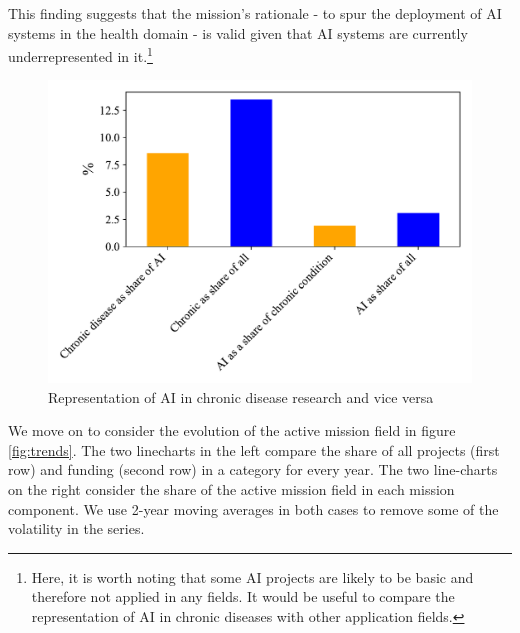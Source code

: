 \documentclass[11pt]{article}
\begin{document}
This finding suggests that the mission's rationale - to spur the deployment of AI systems in the health domain - is valid given that AI systems are currently underrepresented in it.\footnote{Here, it is worth noting that some AI projects are likely to be basic and therefore not applied in any fields. It would be useful to compare the representation of AI in chronic diseases with other application fields.} 

\begin{figure}[!ht]
    \centering
    \includegraphics[width=\textwidth]{figures/fig_6_mission_levels.pdf}
    \caption{Representation of AI in chronic disease research and vice versa}
    \label{fig:active_field}
\end{figure}

We move on to consider the evolution of the active mission field in figure \ref{fig:trends}. The two linecharts in the left compare the share of all projects (first row) and funding (second row) in a category for every year. The two line-charts on the right consider the share of the active mission field in each mission component. We use 2-year moving averages in both cases to remove some of the volatility in the series.
\end{document}
